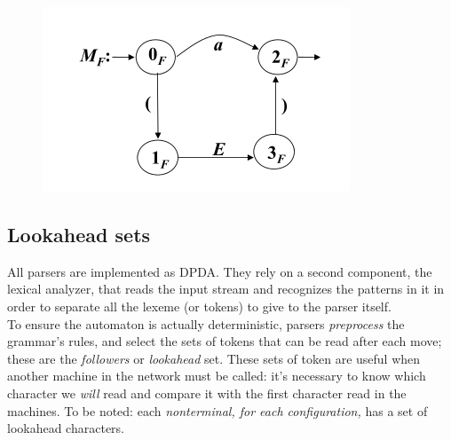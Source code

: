 \documentclass[10pt,a4paper]{article}
\begin{document}
					\begin{figure}[htp]
						\begin{center}
							\includegraphics[]{./images/exF.png}
						\end{center}
					\end{figure}
					
			\subsection{Lookahead sets}
				All parsers are implemented as DPDA. They rely on a second component, the lexical analyzer, that reads the input stream and recognizes the patterns in it in order to separate all the lexeme (or tokens) to give to the parser itself.\\
				To ensure the automaton is actually deterministic, parsers \emph{preprocess} the grammar's rules, and select the sets of tokens that can be read after each move; these are the \emph{followers} or \emph{lookahead} set. These sets of token are useful when another machine in the network must be called: it's necessary to know which character we \emph{will} read and compare it with the first character read in the machines. To be noted: each \emph{nonterminal, for each configuration,} has a set of lookahead characters. 
				
\end{document}
